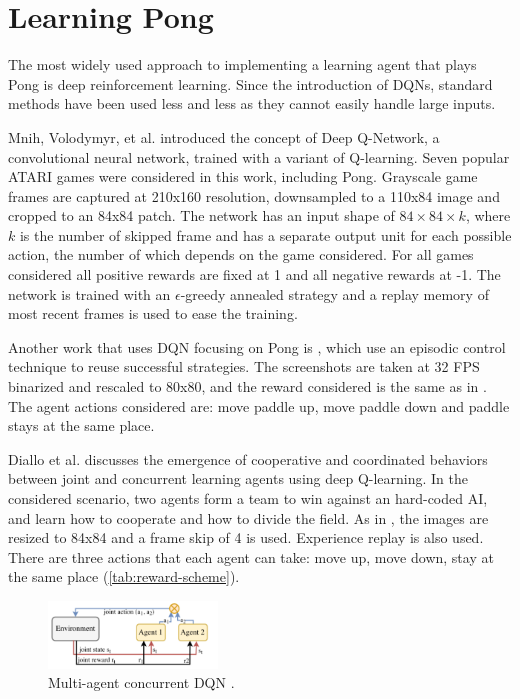 \section{Learning Pong}
\label{sec:pong}
The most widely used approach to implementing a learning agent that plays Pong is deep reinforcement learning.
Since the introduction of DQNs, standard methods have been used less and less as they cannot easily handle large inputs.


Mnih, Volodymyr, et al. \cite{mnih2013playing} introduced the concept of Deep Q-Network, a convolutional neural network, trained with a variant of Q-learning.
Seven popular ATARI games were considered in this work, including Pong.
%
Grayscale game frames are captured at 210x160 resolution, downsampled to a 110x84 image and cropped to an 84x84 patch.
%
The network has an input shape of $84\times 84\times k$, where $k$ is the number of skipped frame and has a separate output unit for each possible action, 
the number of which depends on the game considered. 
For all games considered all positive rewards are fixed at 1 and all negative rewards at -1.
%
The network is trained with an $\epsilon$-greedy annealed strategy and a replay memory of most recent frames is used to ease the training.

Another work that uses DQN focusing on Pong is \cite{makarov2017learning}, which use an episodic control technique \cite{blundell2016model} to reuse successful
strategies.
%
The screenshots are taken at 32 FPS binarized and rescaled to 80x80, and the reward considered is the same as in \cite{mnih2013playing}.
The agent actions considered are: move paddle up, move paddle down and paddle stays at the same place.

Diallo et al. \cite{diallo2017learning} discusses the emergence of cooperative and coordinated behaviors between joint and concurrent learning
agents using deep Q-learning. 
%
In the considered scenario, two agents form a team to win against an hard-coded AI,
and learn how to cooperate and how to divide the field.
%
As in \cite{mnih2013playing}, the images are resized to 84x84 and a frame skip of 4 is used.
Experience replay is also used.
%
There are three actions that each agent can take: move up, move down, stay at the same place (\cref{tab:reward-scheme}).

\begin{figure}[ht]
  \centering
  \includegraphics[width=0.4\textwidth]{images/DQN_MAS.png}
  \caption{Multi-agent concurrent DQN \cite{diallo2017learning}.}
  \label{fig:dqnmas}
\end{figure}

